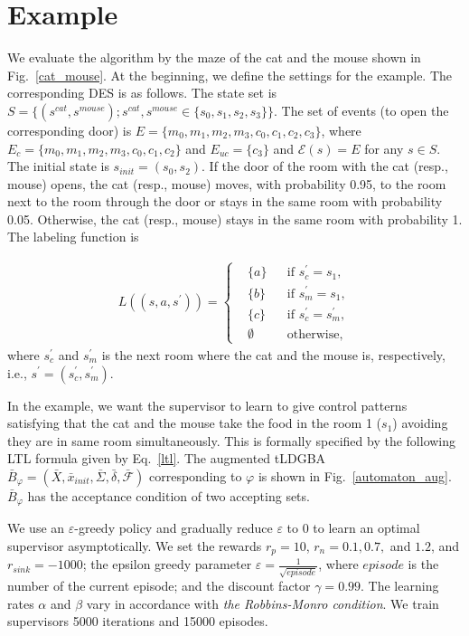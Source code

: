 \section{Example}
We evaluate the algorithm by the maze of the cat and the mouse shown in Fig.\ \ref{cat_mouse}. At the beginning, we define the settings for the example. The corresponding DES is as follows. The state set is $S = \{ (s^{cat}, s^{mouse}) ; s^{cat},s^{mouse} \in \{ s_0,s_1,s_2,s_3 \} \}$. The set of events (to open the corresponding door) is $E = \{ m_0, m_1, m_2, m_3, c_0, c_1, c_2, c_3 \}$, where $E_{c} = \{ m_0, m_1, m_2, m_3, c_0, c_1, c_2 \}$ and $E_{uc} = \{ c_3 \}$ and $\mathcal{E}(s) = E$ for any $s \in S$. The initial state is $s_{init} = (s_0, s_2)$. If the door of the room with the cat (resp., mouse) opens, the cat (resp., mouse) moves, with probability 0.95, to the room next to the room through the door or stays in the same room with probability 0.05. Otherwise, the cat (resp., mouse) stays in the same room with probability 1. The labeling function is

\begin{align}
   L((s, a, s^{\prime})) =
    \left\{
    \begin{aligned}
      & \{ a \} &  & \text{if }s_c^{\prime} = s_1, \nonumber \\
      & \{ b \} &  & \text{if }s_m^{\prime} = s_1, \nonumber \\
      & \{ c \} &  & \text{if }s_c^{\prime} = s_m^{\prime}, \nonumber \\
      & \emptyset &  & \text{otherwise},
    \end{aligned}
    \right.
\end{align}
where $s_c^{\prime}$ and $s_m^{\prime}$ is the next room where the cat and the mouse is, respectively, i.e., $s^{\prime} = (s_c^{\prime},s_m^{\prime})$.

In the example, we want the supervisor to learn to give control patterns satisfying that the cat and the mouse take the food in the room 1 ($s_1$) avoiding they are in same room simultaneously. This is formally specified by the following LTL formula given by Eq.\ \ref{ltl}.
The augmented tLDGBA $\bar{B}_{\varphi} = (\bar{X},\bar{x}_{init},\bar{\Sigma},\bar{\delta},\bar{\mathcal{F}})$ corresponding to $\varphi$ is shown in Fig.\ \ref{automaton_aug}. $\bar{B}_{\varphi}$ has the acceptance condition of two accepting sets.

We use an $\varepsilon$-greedy policy and gradually reduce $\varepsilon$ to 0 to learn an optimal supervisor asymptotically.
We set the rewards $r_p = 10$, $r_{n} = 0.1, 0.7,$ and $1.2$, and $r_{sink} = -1000$; the epsilon greedy parameter $ \varepsilon = \frac{1}{ \sqrt{episode} }$, where $episode$ is the number of the current episode; and the discount factor $\gamma = 0.99$. %
The learning rates $\alpha$ and $\beta$ vary in accordance with {\it the Robbins-Monro condition}. We train supervisors 5000 iterations and 15000 episodes.

